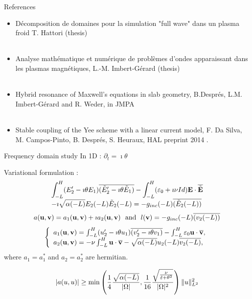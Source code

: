 \begin{frame}{References}
\begin{itemize}
\item Décomposition de domaines pour la simulation "full wave" dans un plasma froid T. Hattori (thesis) \\ \ \\
\item Analyse mathématique et numérique de problèmes d’ondes apparaissant dans les plasmas
magnétiques, L.-M. Imbert-Gérard (thesis)\\ \ \\
\item Hybrid resonance of Maxwell's equations in slab geometry, B.Després, L.M. Imbert-Gérard and R. Weder, in JMPA\\ \ \\
\item  Stable coupling of the Yee scheme with a linear current model, F. Da Silva, M. Campos-Pinto, B. Després, S. Heuraux, HAL preprint 2014 . \\ 
\end{itemize}
\end{frame}
\begin{frame}{Frequency domain study}
In 1D : $\partial_t = \imath \theta$


\alert{Variational formulation :}
\[
\begin{array}{l}
\displaystyle \int_{-L}^H (E_2' -\imath\theta E_1)\overline{(\tilde E_2' -\imath \theta \tilde E_1)} - \int_{-L}^H ({\bf \varepsilon}_0 +\imath\nu Id) {\bf E} \cdot \overline{\tilde {{\bf E}}}
\\ \displaystyle  - \imath \sqrt{\alpha(-L)} E_2 (-L) \tilde E_2 (-L) = -g_{inc} (-L) \overline{( \tilde E_2(-L) )} 
\end{array}
\]
\[
a({\bf u},{\bf v}) = a_1 ({\bf u},{\bf v}) +\imath a_2({\bf u},{\bf v})\  \text{ and } \  l({\bf v}) = -g_{inc} (-L) \overline{(v_2(-L) )} 
\]
\[
\left\{\begin{array}{l}
a_1({\bf u},{\bf v}) = \int_{-L}^H (u_2' -\imath\theta u_1)\overline{(v_2' -\imath \theta v_1)} - \int_{-L}^H {\bf \varepsilon}_0 {\bf u}\cdot \overline{{\bf v}}, 
\\ a_2({\bf u},{\bf v}) = -\nu \int_{-L}^H  {\bf u}\cdot \overline{{\bf v}} -  \sqrt{\alpha(-L)} u_2 (-L) \overline{v_2 (-L)} , 
\end{array}\right.
\]
where $a_1= a_1^*$ and $a_2=a_2^*$ are hermitian.
\begin{block}{}
\[
|a(u,u)| \geq \min\left(\frac{1}{4} \frac{\sqrt{\alpha(-L)}}{|\Omega|} , \frac{1}{16}\frac{\sqrt{\frac{\nu}{{\hat{{\bf \varepsilon}}} + \theta^2}}}{|\Omega|^2}\right) \|u\|^2_{L^2}
\]
\end{block}
\end{frame}

